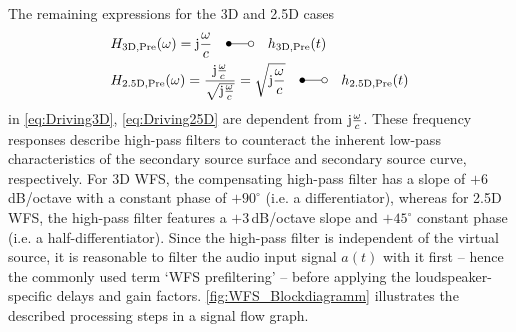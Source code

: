 The remaining expressions for the 3D and 2.5D cases
%
\begin{align}
&H_\text{3D,Pre}(\omega) = \im\frac{\omega}{c} \quad\Laplace\quad h_\text{3D,Pre}(t)
\label{eq:Prefilter3D}\\
%
&H_\text{2.5D,Pre}(\omega) = \frac{\im\frac{\omega}{c}}{\sqrt{\im\frac{\omega}{c}}} = \sqrt{\im\frac{\omega}{c}} \quad\Laplace\quad h_\text{2.5D,Pre}(t)
\label{eq:Prefilter25D}
\end{align}
%
in \myeqn\eqref{eq:Driving3D}, \eqref{eq:Driving25D}
are dependent from $\im\wc$.
%
These frequency responses describe high-pass filters to counteract the
inherent low-pass characteristics of the secondary source surface and
secondary source curve, respectively.
%
For 3D WFS, the compensating high-pass filter has a slope of $+6$\,dB/octave with
a constant phase of $+90^\circ$ (i.e. a differentiator),
whereas for 2.5D WFS, the high-pass filter features
a $+3$\,dB/octave slope and $+45^\circ$ constant phase
(i.e. a half-differentiator).
%
Since the high-pass filter %
is independent of the virtual source, it is reasonable to filter the audio
input signal $a(t)$ with it first -- hence the commonly used term
`WFS prefiltering' --
before applying the loudspeaker-specific delays and gain factors.
%
\myfig\ref{fig:WFS_Blockdiagramm} illustrates the described
processing steps in a signal flow graph.



